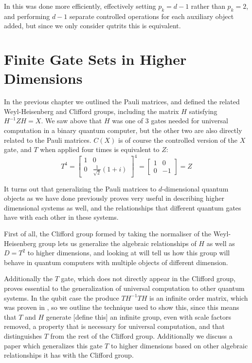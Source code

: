 In \cite{multi-valued-logic} this was done more efficiently, effectively setting $p_k = d-1$ rather than $p_k = 2$, and performing $d-1$ separate controlled operations for each auxiliary object added, but since we only consider qutrits this is equivalent.

\section{Finite Gate Sets in Higher Dimensions}
In the previous chapter we outlined the Pauli matrices, and defined the related Weyl-Heisenberg and Clifford groups, including the matrix $H$ satisfying $H^{-1}ZH = X$. We saw above that $H$ was one of 3 gates needed for universal computation in a binary quantum computer, but the other two are also directly related to the Pauli matrices. $C(X)$ is of course the controlled version of the $X$ gate, and $T$ when applied four times is equivalent to $Z$:
\[
T^4 = \left[\begin{matrix}
1 & 0 \\
0 & \frac{1}{\sqrt{2}}(1+i)
\end{matrix}\right]^4 = \left[\begin{matrix}
1 & 0 \\
0 & -1
\end{matrix}\right] = Z\]

It turns out that generalizing the Pauli matrices to $d$-dimensional quantum objects as we have done previously proves very useful in describing higher dimensional systems as well, and the relationships that different quantum gates have with each other in these systems.

First of all, the Clifford group formed by taking the normaliser of the Weyl-Heisenberg group lets us generalize the algebraic relationships of $H$ as well as $D = T^2$ to higher dimensions, and looking at \cite{tolar-clifford} will tell us how this group will behave in quantum computers with multiple objects of different dimension.

Additionally the $T$ gate, which does not directly appear in the Clifford group, proves essential to the generalization of universal computation to other quantum systems. In the qubit case the produce $TH^{-1}TH$ is an infinite order matrix, which was proven in \cite{pi-over-eight}, so we outline the technique used to show this, since this means that $T$ and $H$ generate [define this] an infinite group, even with scale factors removed, a property that is necessary for universal computation, and that distinguishes $T$ from the rest of the Clifford group. Additionally we discuss a paper \cite{pi-over-eight} which generalizes this gate $T$ to higher dimensions based on other algebraic relationships it has with the Clifford group.
